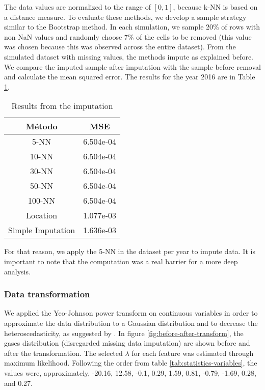 The data values are normalized to the range of $[0,1]$, because k-NN is based
on a distance measure. To evaluate these methods, we develop a sample strategy
similar to the Bootstrap method. In each simulation, we sample 20\% of rows with
non NaN values and randomly choose 7\% of the cells to be removed (this value
was chosen because this was observed across the entire dataset). From the simulated
dataset with missing values, the methods impute as explained before. We
compare the imputed sample after imputation with the sample before removal and calculate
the mean squared error. The results for the year 2016 are in Table \ref{tab:result-imputation}. 

\begin{table}[!hb]
    \centering
    \begin{tabular}{|c|c|}
    \hline
    \textbf{Método}   & \textbf{MSE} \\ \hline
    5-NN              & 6.504e-04    \\ \hline
    10-NN             & 6.504e-04    \\ \hline
    30-NN             & 6.504e-04    \\ \hline
    50-NN             & 6.504e-04    \\ \hline
    100-NN            & 6.504e-04    \\ \hline
    Location          & 1.077e-03    \\ \hline
    Simple Imputation & 1.636e-03    \\ \hline
    \end{tabular}
    \caption{Results from the imputation}
    \label{tab:result-imputation}
\end{table}

For that reason, we apply the 5-NN in the dataset per year to impute data. It
is important to note that the computation was a real barrier for a more deep
analysis. 

\subsubsection{Data transformation}
\label{sec:data-transform}

We applied the Yeo-Johnson power transform \cite{yeo2000} on continuous
variables in order to approximate the data distribution to a Gaussian
distribution and to
decrease the heteroscedasticity, as suggested by \cite{gocheva2014}. In figure
\ref{fig:before-after-transform}, the gases distribution (disregarded
missing data imputation) are shown before and after the transformation. The
selected $\lambda$ for each feature was estimated through maximum likelihood.
Following the order from table \ref{tab:statistics-variables}, the values
were, approximately,  
-20.16, 12.58, -0.1, 0.29, 1.59, 0.81, -0.79, -1.69, 0.28, and 0.27.

